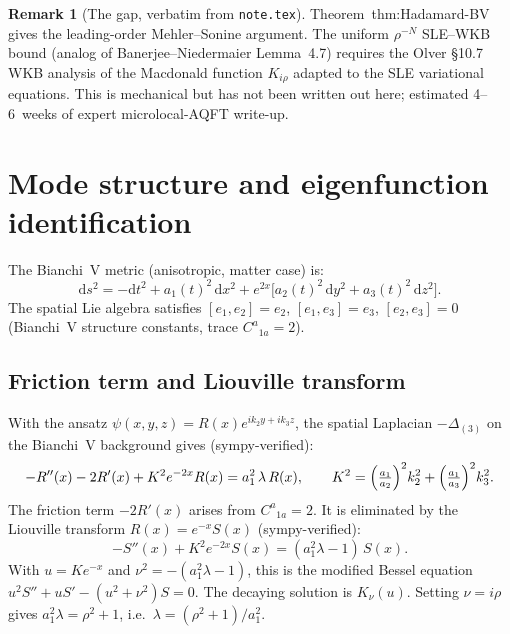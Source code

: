 \documentclass[11pt]{article}
\theoremstyle{definition}
\newtheorem{remark}[theorem]{Remark}
\begin{document}
\begin{remark}[The gap, verbatim from \texttt{note.tex}]\label{rem:BV-gap}
Theorem~thm:Hadamard-BV gives the leading-order Mehler--Sonine argument. The
uniform $\rho^{-N}$ SLE--WKB bound (analog of Banerjee--Niedermaier Lemma~4.7)
requires the Olver \S10.7 WKB analysis of the Macdonald function $K_{i\rho}$
adapted to the SLE variational equations. This is mechanical but has not been
written out here; estimated 4--6~weeks of expert microlocal-AQFT write-up.
\end{remark}

\section{Mode structure and eigenfunction identification}\label{sec:modes}

The Bianchi~V metric (anisotropic, matter case) is:
\begin{equation}\label{eq:BV-metric}
\mathrm{d}s^2 = -\mathrm{d}t^2 + a_1(t)^2\,\mathrm{d}x^2
  + e^{2x}\bigl[a_2(t)^2\,\mathrm{d}y^2 + a_3(t)^2\,\mathrm{d}z^2\bigr].
\end{equation}
The spatial Lie algebra satisfies $[e_1, e_2] = e_2$, $[e_1, e_3] = e_3$, $[e_2,e_3]=0$
(Bianchi~V structure constants, trace $C^a{}_{1a} = 2$).

\subsection{Friction term and Liouville transform}

With the ansatz $\psi(x,y,z) = R(x)e^{ik_2 y + ik_3 z}$, the spatial Laplacian
$-\Delta_{(3)}$ on the Bianchi~V background gives (sympy-verified):
\begin{equation}\label{eq:friction}
-R''(x) - 2R'(x) + K^2 e^{-2x} R(x) = a_1^2\,\lambda\, R(x),\qquad
K^2 = \Bigl(\tfrac{a_1}{a_2}\Bigr)^2 k_2^2 + \Bigl(\tfrac{a_1}{a_3}\Bigr)^2 k_3^2.
\end{equation}
The friction term $-2R'(x)$ arises from $C^a{}_{1a} = 2$. It is eliminated by the
Liouville transform $R(x) = e^{-x}S(x)$ (sympy-verified):
\begin{equation}\label{eq:liouville}
-S''(x) + K^2 e^{-2x} S(x) = (a_1^2\lambda - 1)\,S(x).
\end{equation}
With $u = Ke^{-x}$ and $\nu^2 = -(a_1^2\lambda - 1)$, this is the modified Bessel
equation $u^2 S'' + uS' - (u^2 + \nu^2)S = 0$. The decaying solution is $K_\nu(u)$.
Setting $\nu = i\rho$ gives $a_1^2\lambda = \rho^2 + 1$, i.e.\ $\lambda = (\rho^2+1)/a_1^2$.
\end{document}
